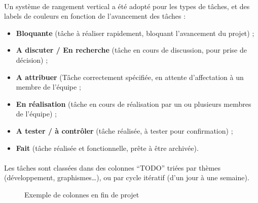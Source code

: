 \paragraph{}
Un système de rangement vertical a été adopté pour les types de tâches, et des labels de couleurs en fonction de l’avancement des tâches :

\begin{itemize}
\item \textbf{Bloquante} (tâche à réaliser rapidement, bloquant l’avancement du projet) ;
\item \textbf{A discuter / En recherche} (tâche en cours de discussion, pour prise de décision) ;
\item \textbf{A attribuer} (Tâche correctement spécifiée, en attente d’affectation à un membre de l’équipe ;
\item \textbf{En réalisation} (tâche en cours de réalisation par un ou plusieurs membres de l’équipe) ;
\item \textbf{A tester / à contrôler} (tâche réalisée, à tester pour confirmation) ;
\item \textbf{Fait} (tâche réalisée et fonctionnelle, prête à être archivée).
\end{itemize}

\paragraph{}
Les tâches sont classées dans des colonnes “TODO” triées par thèmes (développement, graphismes…), ou par cycle itératif (d’un jour à une semaine).

\begin{figure}[H]\centering
  \caption{Exemple de colonnes en fin de projet}
  \label{trelloc}
\end{figure}

